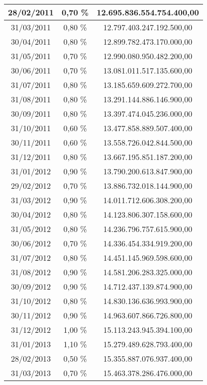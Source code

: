 \begin{center}
\begin{longtable}{|c|c|c|}
28/02/2011 & 0,70 \% & 12.695.836.554.754.400,00  \\ \hline
31/03/2011 & 0,80 \% & 12.797.403.247.192.500,00  \\ \hline
30/04/2011 & 0,80 \% & 12.899.782.473.170.000,00  \\ \hline
31/05/2011 & 0,70 \% & 12.990.080.950.482.200,00  \\ \hline
30/06/2011 & 0,70 \% & 13.081.011.517.135.600,00  \\ \hline
31/07/2011 & 0,80 \% & 13.185.659.609.272.700,00  \\ \hline
31/08/2011 & 0,80 \% & 13.291.144.886.146.900,00  \\ \hline
30/09/2011 & 0,80 \% & 13.397.474.045.236.000,00  \\ \hline
31/10/2011 & 0,60 \% & 13.477.858.889.507.400,00  \\ \hline
30/11/2011 & 0,60 \% & 13.558.726.042.844.500,00  \\ \hline
31/12/2011 & 0,80 \% & 13.667.195.851.187.200,00  \\ \hline
31/01/2012 & 0,90 \% & 13.790.200.613.847.900,00  \\ \hline
29/02/2012 & 0,70 \% & 13.886.732.018.144.900,00  \\ \hline
31/03/2012 & 0,90 \% & 14.011.712.606.308.200,00  \\ \hline
30/04/2012 & 0,80 \% & 14.123.806.307.158.600,00  \\ \hline
31/05/2012 & 0,80 \% & 14.236.796.757.615.900,00  \\ \hline
30/06/2012 & 0,70 \% & 14.336.454.334.919.200,00  \\ \hline
31/07/2012 & 0,80 \% & 14.451.145.969.598.600,00  \\ \hline
31/08/2012 & 0,90 \% & 14.581.206.283.325.000,00  \\ \hline
30/09/2012 & 0,90 \% & 14.712.437.139.874.900,00  \\ \hline
31/10/2012 & 0,80 \% & 14.830.136.636.993.900,00  \\ \hline
30/11/2012 & 0,90 \% & 14.963.607.866.726.800,00  \\ \hline
31/12/2012 & 1,00 \% & 15.113.243.945.394.100,00  \\ \hline
31/01/2013 & 1,10 \% & 15.279.489.628.793.400,00  \\ \hline
28/02/2013 & 0,50 \% & 15.355.887.076.937.400,00  \\ \hline
31/03/2013 & 0,70 \% & 15.463.378.286.476.000,00  \\ \hline

\end{longtable}
\end{center}
